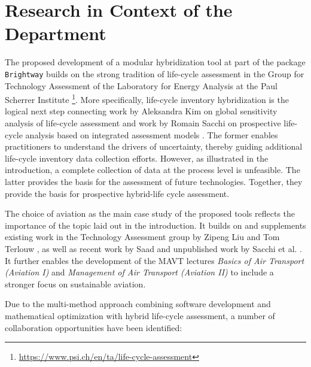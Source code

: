 \documentclass{article}
\begin{document}
\section{Research in Context of the Department}

    The proposed development of a modular hybridization tool at part of the package \texttt{Brightway} builds on the strong tradition of life-cycle assessment in the Group for Technology Assessment of the Laboratory for Energy Analysis at the Paul Scherrer Institute \footnote{\url{https://www.psi.ch/en/ta/life-cycle-assessment}}. More specifically, life-cycle inventory hybridization is the logical next step connecting work by Aleksandra Kim on global sensitivity analysis of life-cycle assessment \cite{kim_aleksandra-kimgwp_uncertainties_2022}\cite{kim_aleksandra-kimgsa_framework_2021}\cite{paulillo_influential_2021} and work by Romain Sacchi on prospective life-cycle analysis based on integrated assessment models \cite{noauthor_premise_2022}\cite{sacchi_prospective_2022}. The former enables practitioners to understand the drivers of uncertainty, thereby guiding additional life-cycle inventory data collection efforts. However, as illustrated in the introduction, a complete collection of data at the process level is unfeasible. The latter provides the basis for the assessment of future technologies. Together, they provide the basis for prospective hybrid-life cycle assessment. 
    
    The choice of aviation as the main case study of the proposed tools reflects the importance of the topic laid out in the introduction. It builds on and supplements existing work in the Technology Assessment group by Zipeng Liu and Tom Terlouw \cite{terlouw_large-scale_2022}, as well as recent work by Saad \cite{saad_synthetic_2022} and unpublished work by Sacchi et al. \cite{sacchi_climate-neutral_2022}. It further enables the development of the MAVT lectures \textit{Basics of Air Transport (Aviation I)} and \textit{Management of Air Transport (Aviation II)} to include a stronger focus on sustainable aviation.
    
    Due to the multi-method approach combining software development and mathematical optimization with hybrid life-cycle assessment, a number of collaboration opportunities have been identified:
	
\end{document}
